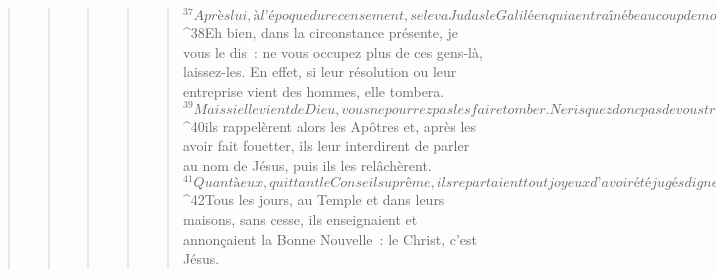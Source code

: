 \begin{verse}
\begin{verse}
\begin{verse}
\begin{verse}
\begin{verse}
${}^{37}Après lui, à l’époque du recensement, se leva Judas le Galiléen qui a entraîné beaucoup de monde derrière lui. Il a péri lui aussi, et tous ses partisans ont été dispersés. 
${}^{38}Eh bien, dans la circonstance présente, je vous le dis : ne vous occupez plus de ces gens-là, laissez-les. En effet, si leur résolution ou leur entreprise vient des hommes, elle tombera. 
${}^{39}Mais si elle vient de Dieu, vous ne pourrez pas les faire tomber. Ne risquez donc pas de vous trouver en guerre contre Dieu. »
      Les membres du Conseil se laissèrent convaincre ; 
${}^{40}ils rappelèrent alors les Apôtres et, après les avoir fait fouetter, ils leur interdirent de parler au nom de Jésus, puis ils les relâchèrent. 
${}^{41}Quant à eux, quittant le Conseil suprême, ils repartaient tout joyeux d’avoir été jugés dignes de subir des humiliations pour le nom de Jésus. 
${}^{42}Tous les jours, au Temple et dans leurs maisons, sans cesse, ils enseignaient et annonçaient la Bonne Nouvelle : le Christ, c’est Jésus.
      

\end{verse}
\end{verse}
\end{verse}
\end{verse}
\end{verse}
